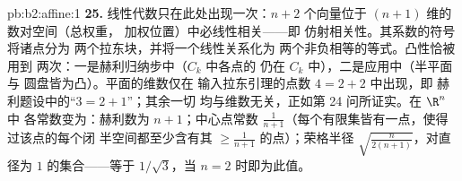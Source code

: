 \begin{solution}{pb:b2:affine:1}
\textbf{25.} 线性代数只在此处出现一次：$n + 2$ 个向量位于
$(n+1)$ 维的数对空间（总权重，
加权位置）中必线性相关——即
仿射相关性。其系数的符号将诸点分为
两个拉东块，并将一个线性关系化为
两个非负相等的等式。凸性恰被用到
两次：一是赫利归纳步中（$C_k$ 中各点的
仍在 $C_k$ 中），二是应用中（半平面与
圆盘皆为凸）。平面的维数仅在
输入拉东引理的点数 $4 = 2 + 2$ 中出现，即
赫利题设中的“$3 = 2 + 1$”；其余一切
均与维数无关，正如第 24 问所证实。在 $\R^n$ 中
各常数变为：赫利数为 $n + 1$；中心点常数
$\frac1{n+1}$（每个有限集皆有一点，使得过该点的每个闭
半空间都至少含有其 $\geq
\frac1{n+1}$ 的点）；荣格半径
$\sqrt{\frac{n}{2(n+1)}}$，对直径为 $1$ 的集合——等于
$1/\sqrt3$，当 $n = 2$ 时即为此值。
\end{solution}
